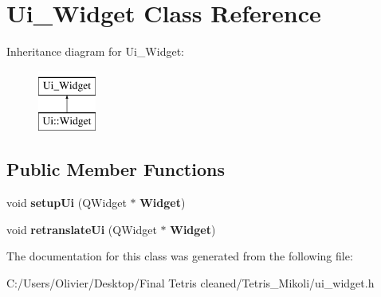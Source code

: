 \section{Ui\+\_\+\+Widget Class Reference}
\label{class_ui___widget}
Inheritance diagram for Ui\+\_\+\+Widget\+:\begin{figure}[H]
\begin{center}
\leavevmode
\includegraphics[height=2.000000cm]{class_ui___widget}
\end{center}
\end{figure}
\subsection*{Public Member Functions}
\begin{DoxyCompactItemize}
\item 
\mbox{\label{class_ui___widget_a9039ed8704971418cbe19ef8c9eea266}} 
void {\bfseries setup\+Ui} (Q\+Widget $\ast$\textbf{ Widget})
\item 
\mbox{\label{class_ui___widget_ae1cb85db8d3658df8dcd104361edcecb}} 
void {\bfseries retranslate\+Ui} (Q\+Widget $\ast$\textbf{ Widget})
\end{DoxyCompactItemize}


The documentation for this class was generated from the following file\+:\begin{DoxyCompactItemize}
\item 
C\+:/\+Users/\+Olivier/\+Desktop/\+Final Tetris cleaned/\+Tetris\+\_\+\+Mikoli/ui\+\_\+widget.\+h\end{DoxyCompactItemize}
